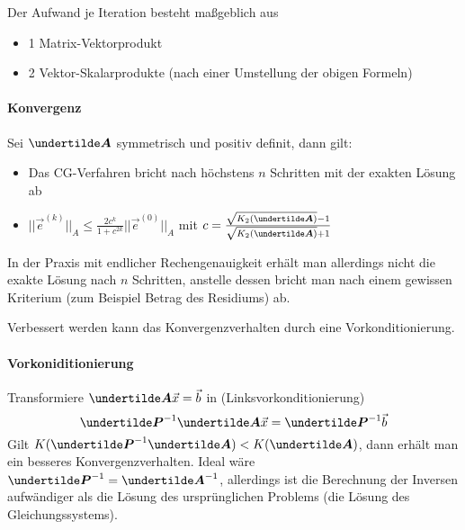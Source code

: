 Der Aufwand je Iteration besteht maßgeblich aus
\begin{itemize}
	\item 1 Matrix-Vektorprodukt
	\item 2 Vektor-Skalarprodukte (nach einer Umstellung der obigen Formeln)
\end{itemize}

\paragraph{Konvergenz} Sei $\ma{A}$ symmetrisch und positiv definit, dann gilt:
\begin{itemize}
	\item Das CG-Verfahren bricht nach höchstens $n$ Schritten mit der exakten Lösung ab
	\item $||\vec{e}^{(k)}||_A \le \frac{2 c^k}{1 + c^{2k}} ||\vec{e}^{(0)}||_A$ mit $c = \frac{\sqrt{K_2(\ma{A})} - 1}{\sqrt{K_2(\ma{A})} + 1}$
\end{itemize}
In der Praxis mit endlicher Rechengenauigkeit erhält man allerdings nicht die exakte Lösung nach $n$ Schritten, anstelle dessen bricht man nach einem gewissen Kriterium (zum Beispiel Betrag des Residiums) ab.

Verbessert werden kann das Konvergenzverhalten durch eine Vorkonditionierung.

\paragraph{Vorkoniditionierung} Transformiere $\ma{A} \vec{x} = \vec{b}$ in (Linksvorkonditionierung)
\begin{equation}
	\ma{P}^{-1} \ma{A} \vec{x} = \ma{P}^{-1} \vec{b}
\end{equation}
Gilt $K(\ma{P}^{-1} \ma{A}) < K(\ma{A})$, dann erhält man ein besseres Konvergenzverhalten. Ideal wäre $\ma{P}^{-1} = \ma{A}^{-1}$, allerdings ist die Berechnung der Inversen aufwändiger als die Lösung des ursprünglichen Problems (die Lösung des Gleichungssystems).